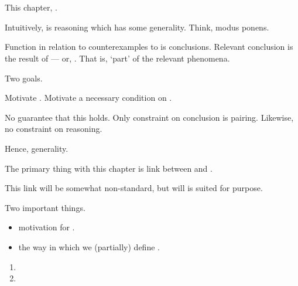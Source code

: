 \chapter{}
\label{cha:typical}

\begin{note}
  This chapter, \tR{}.

  Intuitively, \tR{} is reasoning which has some generality.
  Think, modus ponens.
\end{note}

\begin{note}
  Function in relation to counterexamples to \issueConstraint{} is conclusions.
  Relevant conclusion is the result of \tR{} --- or, \tR[concluding]{}.
  That is, `part' of the relevant phenomena.

  Two goals.

  Motivate \tR{}.
  Motivate a necessary condition on \tR{}.
\end{note}

\begin{note}
  No guarantee that this holds.
  Only constraint on conclusion is pairing.
  Likewise, no constraint on reasoning.

  Hence, generality.
\end{note}

\begin{note}
  The primary thing with this chapter is link between \tor{} and \tR{}.

  This link will be somewhat non-standard, but will is suited for purpose.
\end{note}

\begin{note}
  Two important things.

  \begin{itemize}
  \item
    motivation for \tR{}.
  \item
    the way in which we (partially) define \tR{}.
  \end{itemize}
\end{note}

\begin{note}
  \begin{enumerate}[label=]
  \item
  \item
  \end{enumerate}
\end{note}

